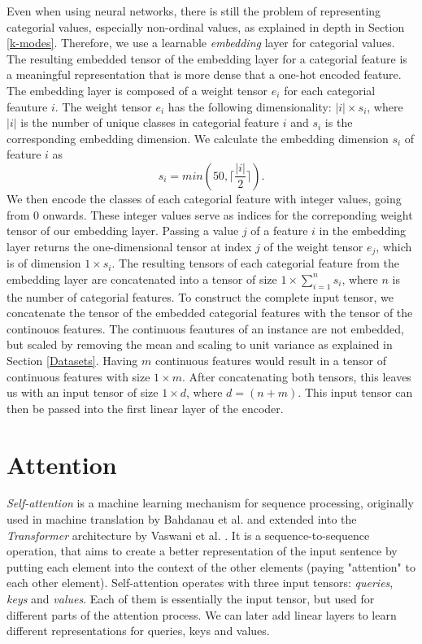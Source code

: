 Even when using neural networks, there is still the problem of representing categorial values, especially non-ordinal values, as explained in depth in Section \ref{k-modes}. Therefore, we use a learnable \textit{embedding} layer for categorial values. The resulting embedded tensor of the embedding layer for a categorial feature is a meaningful representation that is more dense that a one-hot encoded feature. The embedding layer is composed of a weight tensor $e_i$ for each categorial feauture $i$. The weight tensor $e_i$  has the following dimensionality: $|i| \times s_i$, where $|i|$ is the number of unique classes in categorial feature $i$ and $s_i$ is the corresponding embedding dimension. We calculate the embedding dimension $s_i$ of feature $i$ as
$$s_i = min(50, \lceil \frac{|i|}{2} \rceil).$$
We then encode the classes of each categorial feature with integer values, going from 0 onwards. These integer values serve as indices for the correponding weight tensor of our embedding layer. Passing a value $j$ of a feature $i$ in the embedding layer returns the one-dimensional tensor at index $j$ of the weight tensor $e_j$, which is of dimension $1 \times s_i$. The resulting tensors of each categorial feature from the embedding layer are concatenated into a tensor of size $1 \times \sum^n_{i=1}s_i$, where $n$ is the number of categorial features. To construct the complete input tensor, we concatenate the tensor of the embedded categorial features with the tensor of the continouos features. The continuous feautures of an instance are not embedded, but scaled by removing the mean and scaling to unit variance as explained in Section \ref{Datasets}. Having $m$ continuous features would result in a tensor of continuous features with size $1 \times m$. After concatenating both tensors, this leaves us with an input tensor of size $1 \times d$, where $d = (n + m)$. This input tensor can then be passed into the first linear layer of the encoder.



\section{Attention}

\textit{Self-attention} is a machine learning mechanism for sequence processing, originally used in machine translation by Bahdanau et al. \cite{bahdanau} and extended into the \textit{Transformer} architecture by Vaswani et al. \cite{attention_is_all_you_need}. It is a sequence-to-sequence operation, that aims to create a better representation of the input sentence by putting each element into the context of the other elements (paying "attention" to each other element). Self-attention operates with three input tensors: \textit{queries}, \textit{keys} and \textit{values}. Each of them is essentially the input tensor, but used for different parts of the attention process. We can later add linear layers to learn different representations for queries, keys and values. 

